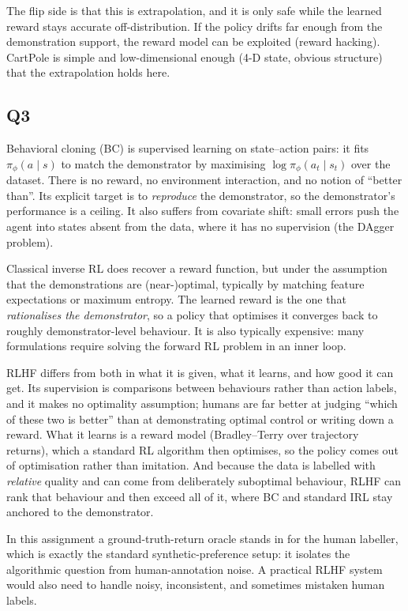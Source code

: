 \documentclass[11pt]{article}
\begin{document}
The flip side is that this is extrapolation, and it is only safe while the learned reward stays
accurate off-distribution. If the policy drifts far enough from the demonstration support,
the reward model can be exploited (reward hacking). CartPole is simple and low-dimensional
enough (4-D state, obvious structure) that the extrapolation holds here.

\subsection*{Q3}

Behavioral cloning (BC) is supervised learning on state--action pairs: it fits
$\pi_\phi(a \mid s)$ to match the demonstrator by maximising $\log \pi_\phi(a_t \mid s_t)$ over
the dataset. There is no reward, no environment interaction, and no notion of ``better than''.
Its explicit target is to \emph{reproduce} the demonstrator, so the demonstrator's performance
is a ceiling. It also suffers from covariate shift: small errors push the agent into states
absent from the data, where it has no supervision (the DAgger problem).

Classical inverse RL does recover a reward function, but under the assumption that the
demonstrations are (near-)optimal, typically by matching feature expectations or maximum
entropy. The learned reward is the one that \emph{rationalises the demonstrator}, so a policy
that optimises it converges back to roughly demonstrator-level behaviour. It is also typically
expensive: many formulations require solving the forward RL problem in an inner loop.

RLHF differs from both in what it is given, what it learns, and how good it can get.
Its supervision is comparisons between behaviours rather than action labels, and it makes no
optimality assumption; humans are far better at judging ``which of these two is better'' than at
demonstrating optimal control or writing down a reward. What it learns is a reward model
(Bradley--Terry over trajectory returns), which a standard RL algorithm then optimises, so the
policy comes out of optimisation rather than imitation. And because the data is labelled with
\emph{relative} quality and can come from deliberately suboptimal behaviour, RLHF can rank that
behaviour and then exceed all of it, where BC and standard IRL stay anchored to the
demonstrator.

In this assignment a ground-truth-return oracle stands in for the human labeller, which is
exactly the standard synthetic-preference setup: it isolates the algorithmic question from
human-annotation noise. A practical RLHF system would also need to handle noisy, inconsistent,
and sometimes mistaken human labels.
\end{document}
